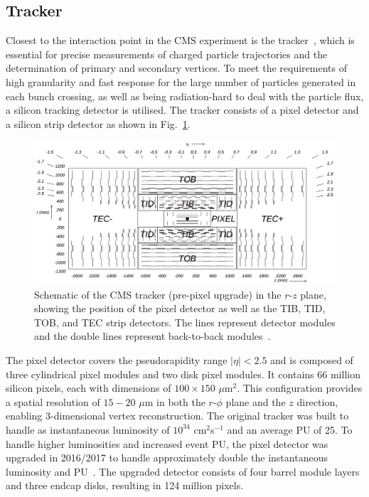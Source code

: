 \subsection{Tracker}

Closest to the interaction point in the \ac{CMS} experiment is the tracker~\cite{CMS_Setup,Malberti:2014pda,CMS:2012sda}, which is essential for precise measurements of charged particle trajectories and the determination of primary and secondary vertices. 
To meet the requirements of high granularity and fast response for the large number of particles generated in each bunch crossing, as well as being radiation-hard to deal with the particle flux, a silicon tracking detector is utilised. 
The tracker consists of a pixel detector and a silicon strip detector as shown in Fig.~\ref{fig:tracker}. \\

\begin{figure}[!hbtp]
    \centering
    \includegraphics[width=\textwidth]{Figures/tracker.png}
    \caption{Schematic of the \ac{CMS} tracker (pre-pixel upgrade) in the $r$-$z$ plane, showing the position of the pixel detector as well as the \ac{TIB}, \ac{TID}, \ac{TOB}, and \ac{TEC} strip detectors. The lines represent detector modules and the double lines represent back-to-back modules~\cite{CMS_Setup}.}
    \label{fig:tracker}
\end{figure}

The pixel detector covers the pseudorapidity range $|\eta| < 2.5$ and is composed of three cylindrical pixel modules and two disk pixel modules. 
It contains 66 million silicon pixels, each with dimensions of $100 \times 150$ $\mu$m${^2}$. 
This configuration provides a spatial resolution of $15-20$ $\mu$m in both the $r$-$\phi$ plane and the $z$ direction, enabling 3-dimensional vertex reconstruction.
The original tracker was built to handle as instantaneous luminosity of $10^{34}$ cm$^{2}$s$^{-1}$ and an average PU of 25.
To handle higher luminosities and increased event PU, the pixel detector was upgraded in 2016/2017 to handle approximately double the instantaneous luminosity and \ac{PU}~\cite{CMS:2012sda}. 
The upgraded detector consists of four barrel module layers and three endcap disks, resulting in 124 million pixels. \\

